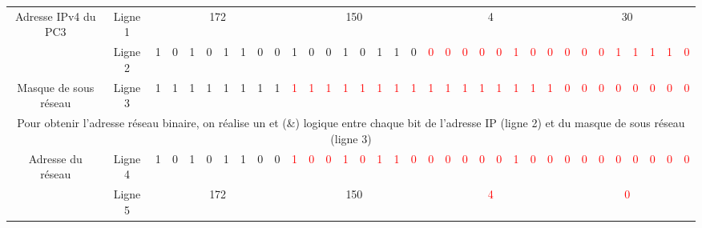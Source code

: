 \documentclass[11pt,a4paper,landscape]{article}
\begin{document}
\begin{tabular}{|c|c||c|c|c|c|c|c|c|c||c|c|c|c|c|c|c|c||c|c|c|c|c|c|c|c||c|c|c|c|c|c|c|c||}
    \hline
    \multirow{2}{*}{Adresse IPv4  du PC3} & Ligne 1 & \multicolumn{8}{|c||}{172} & \multicolumn{8}{|c||}{150} & \multicolumn{8}{|c||}{4} & \multicolumn{8}{|c||}{30} \\
    \cline{2-34}
    & Ligne 2 & 1 & 0 & 1 & 0 & 1 & 1 &  0 & 0 & 1 & 0 & 0 & 1 & 0 & 1 & 1 & 0 & \textcolor{red}{0} &\textcolor{red}{0} & \textcolor{red}{0} & \textcolor{red}{0}&  \textcolor{red}{0}  & \textcolor{red}{1} & \textcolor{red}{0} & \textcolor{red}{0} & \textcolor{red}{0} &  \textcolor{red}{0} & \textcolor{red}{0}& \textcolor{red}{1} & \textcolor{red}{1} & \textcolor{red}{1} & \textcolor{red}{1} & \textcolor{red}{0}   \\
    \hline
    Masque de sous réseau & Ligne 3 & 1 & 1 & 1 & 1 & 1 & 1& 1 & 1 & \textcolor{red}{1} & \textcolor{red}{1} & \textcolor{red}{1} & \textcolor{red}{1} & \textcolor{red}{1} & \textcolor{red}{1} & \textcolor{red}{1} & \textcolor{red}{1} & \textcolor{red}{1} & \textcolor{red}{1} & \textcolor{red}{1} & \textcolor{red}{1} & \textcolor{red}{1} & \textcolor{red}{1} & \textcolor{red}{1} & \textcolor{red}{1}  & \textcolor{red}{0} & \textcolor{red}{0} & \textcolor{red}{0} & \textcolor{red}{0} & \textcolor{red}{0} &\textcolor{red}{0} & \textcolor{red}{0} & \textcolor{red}{0}\\
    \hline
    \multicolumn{34}{|c|}{Pour obtenir l'adresse réseau binaire, on réalise un {\sc et} (\&) logique entre chaque bit de l'adresse IP (ligne 2) et du masque de sous réseau (ligne 3)}\\
    \hline
    \multirow{2}{*}{Adresse du réseau} & Ligne 4 & 1 & 0 & 1 & 0 & 1 & 1 & 0 & 0 & \textcolor{red}{1} & \textcolor{red}{0} & \textcolor{red}{0} & \textcolor{red}{1} & \textcolor{red}{0} & \textcolor{red}{1} & \textcolor{red}{1} & \textcolor{red}{0} & \textcolor{red}{0} &\textcolor{red}{0} & \textcolor{red}{0} & \textcolor{red}{0}&  \textcolor{red}{0}  & \textcolor{red}{1} & \textcolor{red}{0} & \textcolor{red}{0} & \textcolor{red}{0} & \textcolor{red}{0} & \textcolor{red}{0} & \textcolor{red}{0} & \textcolor{red}{0} & \textcolor{red}{0} & \textcolor{red}{0} & \textcolor{red}{0} \\
    \cline{2-34}
     & Ligne 5 & \multicolumn{8}{|c||}{172} & \multicolumn{8}{|c||}{150} & \multicolumn{8}{|c||}{\textcolor{red}{4}} & \multicolumn{8}{|c||}{\textcolor{red}{0}} \\
    \hline
\end{tabular}
\end{document}
